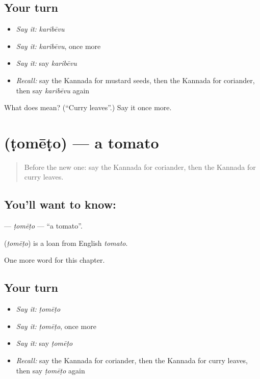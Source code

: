 \subsection*{Your turn}
\begin{itemize}
\raggedright
  \item \emph{Say it:} \emph{karibēvu}
  \item \emph{Say it:} \emph{karibēvu}, once more
  \item \emph{Say it:} say \emph{karibēvu}
  \item \emph{Recall:} say the Kannada for mustard seeds, then the Kannada for coriander, then say \emph{karibēvu} again
\end{itemize}

\begin{tcolorbox}[breakable,colback=teal!4,colframe=teal!35!black,title={Before you move on}]
What does  mean? (\textquotedblleft{}Curry leaves\textquotedblright{}.) Say it once more.
\end{tcolorbox}
\section[\texorpdfstring{\kn{ಟೊಮೇಟೊ} (ṭomēṭo)}{ಟೊಮೇಟೊ (ṭomēṭo)}]{ (ṭomēṭo) — a tomato}

\label{lesson:KA-C293-tometo}



\begin{quote}
Before the new one: say the Kannada for coriander, then the Kannada for curry leaves.
\end{quote}

\subsection*{You'll want to know: }
\textbf{} — \emph{ṭomēṭo} — \textquotedblleft{}a tomato\textquotedblright{}.

\begin{cousinweb}
\textbf{} (\emph{ṭomēṭo}) is a loan from English \emph{tomato}.
\end{cousinweb}

\begin{grammarlens}[title={What you've built}]
One more word for this chapter.
\end{grammarlens}

\subsection*{Your turn}
\begin{itemize}
\raggedright
  \item \emph{Say it:} \emph{ṭomēṭo}
  \item \emph{Say it:} \emph{ṭomēṭo}, once more
  \item \emph{Say it:} say \emph{ṭomēṭo}
  \item \emph{Recall:} say the Kannada for coriander, then the Kannada for curry leaves, then say \emph{ṭomēṭo} again
\end{itemize}

